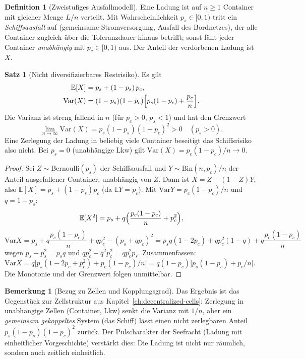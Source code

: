 \documentclass[a4paper, 12pt, twoside, openright]{report}
\theoremstyle{definition}
\newtheorem{definition}[theorem]{Definition}
\theoremstyle{definition}
\newtheorem{satz}{Satz}[chapter]
\newtheorem{bemerkung}{Bemerkung}[chapter]
\newcommand{\E}{\mathbb{E}}
\newcommand{\Var}{\mathrm{Var}}
\begin{document}
\begin{definition}[Zweistufiges Ausfallmodell]\label{def:sb-ausfallmodell}
Eine Ladung ist auf $n\ge1$ Container mit gleicher Menge $L/n$ verteilt. Mit
Wahrscheinlichkeit $p_s\in[0,1)$ tritt ein \emph{Schiffsausfall} auf (gemeinsame Stromversorgung,
Ausfall des Bordnetzes), der alle Container zugleich über die Toleranzdauer hinaus
betrifft; sonst fällt jeder Container \emph{unabhängig} mit $p_c\in[0,1)$ aus. Der Anteil der
verdorbenen Ladung ist $X$.
\end{definition}

\begin{satz}[Nicht diversifizierbares Restrisiko]\label{satz:sb-risiko}
Es gilt
\begin{align}
  \E[X]&=p_s+(1-p_s)\,p_c, \label{eq:sb-EX}\\
  \Var(X)&=(1-p_s)(1-p_c)\Bigl[p_s(1-p_c)+\frac{p_c}{n}\Bigr]. \label{eq:sb-VarX}
\end{align}
Die Varianz ist streng fallend in $n$ (für $p_c>0$, $p_s<1$) und hat den Grenzwert
\begin{equation}
  \lim_{n\to\infty}\Var(X)=p_s(1-p_s)(1-p_c)^2>0\quad(p_s>0).
  \label{eq:sb-VarLim}
\end{equation}
Eine Zerlegung der Ladung in beliebig viele Container beseitigt das Schiffsrisiko also
nicht. Bei $p_s=0$ (unabhängige Lkw) gilt $\Var(X)=p_c(1-p_c)/n\to0$.
\end{satz}

\begin{proof}
Sei $Z\sim\mathrm{Bernoulli}(p_s)$ der Schiffsausfall und $Y\sim\mathrm{Bin}(n,p_c)/n$ der
Anteil ausgefallener Container, unabhängig von $Z$. Dann ist $X=Z+(1-Z)Y$, also
$\E[X]=p_s+(1-p_s)p_c$ (da $\E Y=p_c$). Mit $\Var Y=p_c(1-p_c)/n$ und $q=1-p_s$:
\[
  \E[X^2]=p_s+q\Bigl(\frac{p_c(1-p_c)}{n}+p_c^2\Bigr),
\]
\[
  \Var X=p_s+q\frac{p_c(1-p_c)}{n}+qp_c^2-(p_s+qp_c)^2
  =p_sq(1-2p_c)+qp_c^2(1-q)+q\frac{p_c(1-p_c)}{n}
\]
wegen $p_s-p_s^2=p_sq$ und $qp_c^2-q^2p_c^2=qp_c^2p_s$. Zusammenfassen:
$\Var X=q\bigl[p_s(1-2p_c+p_c^2)+p_c(1-p_c)/n\bigr]=q(1-p_c)\bigl[p_s(1-p_c)+p_c/n\bigr]$. Die
Monotonie und der Grenzwert folgen unmittelbar.
\end{proof}

\begin{bemerkung}[Bezug zu Zellen und Kopplungsgrad]
Das Ergebnis ist das Gegenstück zur Zellstruktur aus Kapitel~\ref{ch:decentralized-cells}:
Zerlegung in unabhängige Zellen (Container, Lkw) senkt die Varianz mit $1/n$, aber ein
\emph{gemeinsam gekoppeltes} System (das Schiff) lässt einen nicht zerlegbaren Anteil
$p_s(1-p_s)(1-p_c)^2$ zurück. Der Pulscharakter der Seefracht (Ladung mit einheitlicher
Vorgeschichte) verstärkt dies: Die Ladung ist nicht nur räumlich, sondern auch zeitlich
einheitlich.
\end{bemerkung}
\end{document}
